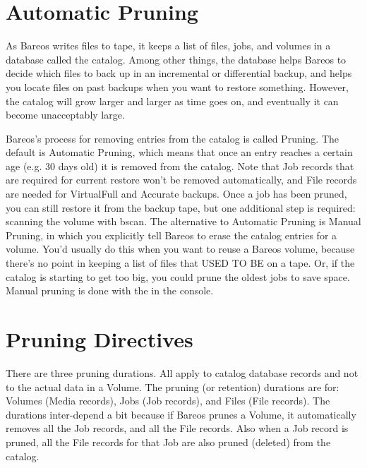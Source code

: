 \section{Automatic Pruning}
\label{AutoPruning}

As Bareos writes files to tape, it keeps a list of files, jobs, and volumes
in a database called the catalog.  Among other things, the database helps
Bareos to decide which files to back up in an incremental or differential
backup, and helps you locate files on past backups when you want to restore
something.  However, the catalog will grow larger and larger as time goes
on, and eventually it can become unacceptably large.

Bareos's process for removing entries from the catalog is called Pruning.  The
default is Automatic Pruning, which means that once an entry reaches a certain
age (e.g.  30 days old) it is removed from the catalog. Note that Job records
that are required for current restore won't be removed automatically, and File
records are needed for VirtualFull and Accurate backups. Once a job has been
pruned, you can still restore it from the backup tape, but one additional step
is required: scanning the volume with bscan.  The alternative to Automatic
Pruning is Manual Pruning, in which you explicitly tell Bareos to erase the
catalog entries for a volume.  You'd usually do this when you want to reuse a
Bareos volume, because there's no point in keeping a list of files that USED TO
BE on a tape.  Or, if the catalog is starting to get too big, you could prune
the oldest jobs to save space.  Manual pruning is done with the  in the console.

\section{Pruning Directives}

There are three pruning durations. All apply to catalog database records and
not to the actual data in a Volume. The pruning (or retention) durations are
for: Volumes (Media records), Jobs (Job records), and Files (File records).
The durations inter-depend a bit because if Bareos prunes a Volume, it
automatically removes all the Job records, and all the File records. Also when
a Job record is pruned, all the File records for that Job are also pruned
(deleted) from the catalog.

